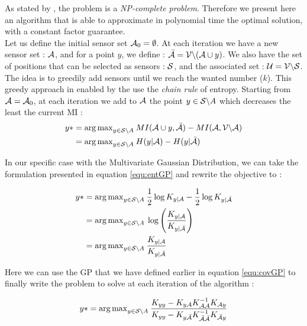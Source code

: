 \documentclass[12pt,twoside]{report}
\begin{document}
 As stated by \citet{krause_near-optimal_2008}, the problem is a \textit{NP-complete problem}. Therefore we present here an algorithm that is able to approximate in polynomial time the optimal solution, with a constant factor guarantee. \\
 
 Let us define the initial sensor set $\A_0 = \emptyset$. At each iteration we have a new sensor set : $\A$,  and for a point $y$, we define : $\bar{\A} = \V \backslash ( \A \cup y )$. We also have the set of positions that can be selected as sensors : $\S$,  and the associated set : $\U = \V \backslash \S $. \\
 
 
 The idea is to greedily add sensors until we reach the wanted number ($k$).   This greedy approach in enabled by the use the \textit{chain rule} of entropy.  Starting from $\A = \A_0$, at each iteration we add to $\A$ the point $y \in \S \backslash A $ which decreases the least the current MI : 
\begin{align}
	y* &= {\arg \max}_{y \in \S \backslash A } \: MI(\A \cup y, \bar{\A} ) - MI(\A, \VA) \\
	&= {\arg \max}_{y \in \S \backslash A } \: H(y | \A ) - H(y | \bar{\A} )
\end{align}

In our specific case with the Multivariate Gaussian Distribution, we can take the formulation presented in equation \ref{equ:entGP} and rewrite the objective to : 

\begin{align}
	y*  &= {\arg \max}_{y \in \S \backslash A } \: \frac{1}{2} \log K_{y | \A} - \frac{1}{2} \log K_{y | \bar{\A}} \\
	&= {\arg \max}_{y \in \S \backslash A } \: \log \left(\frac{K_{y | \A}}{K_{y | \bar{\A}}} \right) \\
	&= {\arg \max}_{y \in \S \backslash A } \: \frac{K_{y | \A}}{K_{y | \bar{\A}}}
\end{align}

Here we can use the GP that we have defined earlier in equation \ref{equ:covGP} to finally write the problem to solve at each iteration of the algorithm : 

\begin{equation}
	y*  = {\arg \max}_{y \in \S \backslash A } \: \frac{K_{yy} - K_{y\A} K_{\A\A}^{-1} K_{\A y} }{K_{yy} - K_{y\bar{\A}} K_{\bar{\A}\bar{\A}}^{-1} K_{\bar{\A} y} } \label{equ:updateGreedy}
\end{equation}
\end{document}

